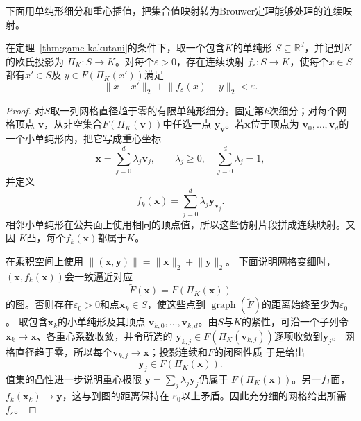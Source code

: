 下面用单纯形细分和重心插值，把集合值映射转为Brouwer定理能够处理的连续映射。

\begin{lemma}[单纯形上的连续近似选择]
\label{lem:game-approximate-selection}
在定理~\ref{thm:game-kakutani}的条件下，取一个包含\(K\)的单纯形
\(S\subseteq\mathbb{R}^d\)，并记到\(K\)的欧氏投影为
\(\Pi_K:S\to K\)。对每个\(\varepsilon>0\)，存在连续映射
\(f_\varepsilon:S\to K\)，使每个\(x\in S\)都有\(x'\in S\)及
\(y\in F(\Pi_K(x'))\)满足
\[
  \lVert x-x'\rVert_2
  +
  \lVert f_\varepsilon(x)-y\rVert_2
  <\varepsilon.
\]
\end{lemma}

\begin{proof}
对\(S\)取一列网格直径趋于零的有限单纯形细分。固定第\(k\)次细分；对每个网格顶点
\(\bm{v}\)，从非空集合\(F(\Pi_K(\bm{v}))\)中任选一点
\(\bm{y}_{\bm{v}}\)。若\(\bm{x}\)位于顶点为
\(\bm{v}_0,\ldots,\bm{v}_d\)的一个小单纯形内，把它写成重心坐标
\[
  \bm{x}
  =
  \sum_{j=0}^{d}\lambda_j\bm{v}_j,
  \qquad
  \lambda_j\geq0,\quad
  \sum_{j=0}^{d}\lambda_j=1,
\]
并定义
\[
  f_k(\bm{x})
  =
  \sum_{j=0}^{d}\lambda_j\bm{y}_{\bm{v}_j}.
\]
相邻小单纯形在公共面上使用相同的顶点值，所以这些仿射片段拼成连续映射。又因
\(K\)凸，每个\(f_k(\bm{x})\)都属于\(K\)。

在乘积空间上使用
\(\lVert(\bm{x},\bm{y})\rVert
=\lVert\bm{x}\rVert_2+\lVert\bm{y}\rVert_2\)。
下面说明网格变细时，\((\bm{x},f_k(\bm{x}))\)会一致逼近对应
\[
  \widetilde F(\bm{x})
  =
  F(\Pi_K(\bm{x}))
\]
的图。否则存在\(\varepsilon_0>0\)和点\(\bm{x}_k\in S\)，使这些点到
\(\operatorname{graph}(\widetilde F)\)的距离始终至少为\(\varepsilon_0\)。
取包含\(\bm{x}_k\)的小单纯形及其顶点
\(\bm{v}_{k,0},\ldots,\bm{v}_{k,d}\)。由\(S\)与\(K\)的紧性，可沿一个子列令
\(\bm{x}_k\to\bm{x}\)、各重心系数收敛，并令所选的
\(\bm{y}_{k,j}\in F(\Pi_K(\bm{v}_{k,j}))\)逐项收敛到\(\bm{y}_j\)。
网格直径趋于零，所以每个\(\bm{v}_{k,j}\to\bm{x}\)；投影连续和\(F\)的闭图性质
于是给出
\[
  \bm{y}_j\in F(\Pi_K(\bm{x})).
\]
值集的凸性进一步说明重心极限
\(\bm{y}=\sum_j\lambda_j\bm{y}_j\)仍属于
\(F(\Pi_K(\bm{x}))\)。另一方面，
\(f_k(\bm{x}_k)\to\bm{y}\)，这与到图的距离保持在
\(\varepsilon_0\)以上矛盾。因此充分细的网格给出所需
\(f_\varepsilon\)。
\end{proof}

